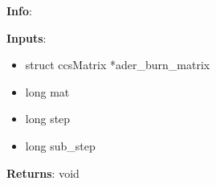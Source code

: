 \textbf{Info}:

\noindent \textbf{Inputs}:
\begin{itemize}
\item{struct ccsMatrix *ader\_burn\_matrix}
\item{long mat}
\item{long step}
\item{long sub\_step}
\end{itemize}

\noindent \textbf{Returns}: void
